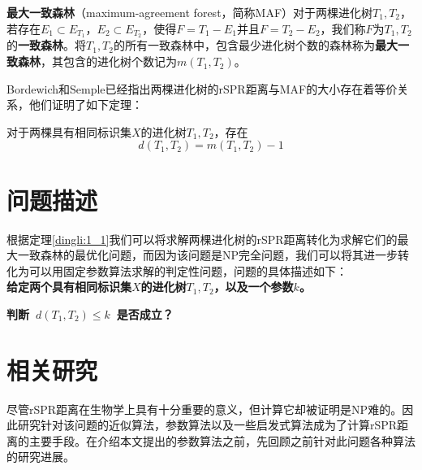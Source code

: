 \begin{dingyi}
\textbf{最大一致森林}（maximum-agreement forest，简称MAF）对于两棵进化树$T_1,T_2$，若存在$E_1 \subset E_{T_1}$，$E_2 \subset E_{T_2}$，使得$F=T_1 - E_1$并且$F=T_2 - E_2$，我们称$F$为$T_1,T_2$的\textbf{一致森林}。将$T_1,T_2$的所有一致森林中，包含最少进化树个数的森林称为\textbf{最大一致森林}，其包含的进化树个数记为\textbf{$m(T_1,T_2)$}。
\end{dingyi}

Bordewich和Semple已经指出两棵进化树的rSPR距离与MAF的大小存在着等价关系，他们证明了如下定理：
\begin{dingli}
\label{dingli:1_1}
对于两棵具有相同标识集$X$的进化树$T_1,T_2$，存在
	\begin{equation*}
		d(T_1,T_2)=m(T_1,T_2)-1
	\end{equation*}
\end{dingli}

\section{问题描述}\label{problem}
根据定理\ref{dingli:1_1}我们可以将求解两棵进化树的rSPR距离转化为求解它们的最大一致森林的最优化问题，而因为该问题是NP完全问题，我们可以将其进一步转化为可以用固定参数算法求解的判定性问题，问题的具体描述如下：
\\

\textbf{给定两个具有相同标识集$X$的进化树$T_1,T_2$，以及一个参数$k$。}

\textbf{判断~$d(T_1,T_2) \le k$~是否成立？}
\clearpage

\section{相关研究}
尽管rSPR距离在生物学上具有十分重要的意义，但计算它却被证明是NP难的。因此研究针对该问题的近似算法，参数算法以及一些启发式算法成为了计算rSPR距离的主要手段。在介绍本文提出的参数算法之前，先回顾之前针对此问题各种算法的研究进展。

